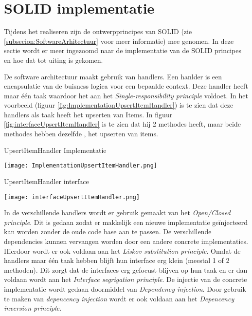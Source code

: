 \section{SOLID implementatie}
Tijdens het realiseren zijn de ontwerpprincipes van SOLID (zie \ref{subsecion:SoftwareArhitectuur} voor meer informatie) mee genomen.
In deze sectie wordt er meer ingezoomd naar de implementatie van de SOLID principes en hoe dat tot uiting is gekomen.

\whitespace
De software architectuur maakt gebruik van handlers.
Een hanlder is een encapsulatie van de buisness logica voor een bepaalde context.
Deze handler heeft maar één taak waardoor het aan het \textit{Single-responsibility principle} voldoet.
In het voorbeeld (figuur \ref{fig:ImplementationUpsertItemHandler}) is te zien dat deze handlers als taak heeft het upserten van Items.
In figuur \ref{fig:interfaceUpsertItemHandler} is te zien dat hij 2 methodes heeft, maar beide methodes hebben dezelfde , het upserten van items.

\whitespace
\begin{graphic}
    \captionsetup{type=figure}
    \caption{UpsertItemHandler Implementatie}
    \texttt{[image: ImplementationUpsertItemHandler.png]}
    \label{fig:ImplementationUpsertItemHandler}
\end{graphic}

\whitespace[2]
\begin{graphic}
    \captionsetup{type=figure}
    \caption{UpsertItemHandler interface}
    \texttt{[image: interfaceUpsertItemHandler.png]}
    \label{fig:interfaceUpsertItemHandler}
\end{graphic}

\whitespace
In de verschillende handlers wordt er gebruik gemaakt van het \textit{Open\slash Closed principle}.
Dit is gedaan zodat er makkelijk een nieuwe implementatie geïnjecteerd kan worden zonder de oude code base aan te passen.
De verschillende dependencies kunnen vervangen worden door een andere concrete implementaties.
Hierdoor wordt er ook voldaan aan het \textit{Liskov substitution principle}.
Omdat de handlers maar één taak hebben blijft hun interface erg klein (meestal 1 of 2 methoden).
Dit zorgt dat de interfaces erg gefocust blijven op hun taak en er dan voldaan wordt aan het \textit{Interface segrigation principle}.
De injectie van de concrete implementatie wordt gedaan doormiddel van \textit{Dependency injection}.
Door gebruik te maken van \textit{depencency injection} wordt er ook voldaan aan het \textit{Depencency inversion principle}.


